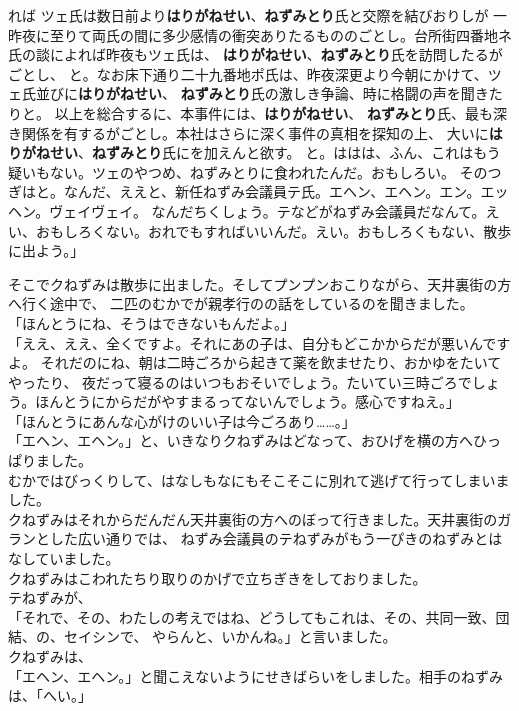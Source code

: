 \documentclass[
a4paper,
10pt,
book]
{tarticle}
\begin{document}
\newpage
\thispagestyle{fancy}
\fancyhead[R]{\empty}
れば
ツェ氏は数日前より\textbf{はりがねせい}、\textbf{ねずみとり}氏と交際を結びおりしが
一昨夜に至りて両氏の間に多少感情の衝突ありたるもののごとし。台所街四番地ネ氏の談によれば昨夜もツェ氏は、
\textbf{はりがねせい}、\textbf{ねずみとり}氏を訪問したるがごとし、
と。なお床下通り二十九番地ポ氏は、昨夜深更より今朝にかけて、ツェ氏並びに\textbf{はりがねせい}、
\textbf{ねずみとり}氏の激しき争論、時に格闘の声を聞きたりと。
以上を総合するに、本事件には、\textbf{はりがねせい}、
\textbf{ねずみとり}氏、最も深き関係を有するがごとし。本社はさらに深く事件の真相を探知の上、
大いに\textbf{はりがねせい}、\textbf{ねずみとり}氏にを加えんと欲す。
と。ははは、ふん、これはもう疑いもない。ツェのやつめ、ねずみとりに食われたんだ。おもしろい。
そのつぎはと。なんだ、ええと、新任ねずみ会議員テ氏。エヘン、エヘン。エン。エッヘン。ヴェイヴェイ。
なんだちくしょう。テなどがねずみ会議員だなんて。えい、おもしろくない。おれでもすればいいんだ。えい。おもしろくもない、散歩に出よう。」

\newpage
\thispagestyle{fancy}
\fancyhead[C]{\empty}
\indent そこでクねずみは散歩に出ました。そしてプンプンおこりながら、天井裏街の方へ行く途中で、
二匹のむかでが親孝行のの話をしているのを聞きました。\indent \\
「ほんとうにね、そうはできないもんだよ。」\\
「ええ、ええ、全くですよ。それにあの子は、自分もどこかからだが悪いんですよ。
それだのにね、朝は二時ごろから起きて薬を飲ませたり、おかゆをたいてやったり、
夜だって寝るのはいつもおそいでしょう。たいてい三時ごろでしょう。ほんとうにからだがやすまるってないんでしょう。感心ですねえ。」\\
「ほんとうにあんな心がけのいい子は今ごろあり……。」\\
「エヘン、エヘン。」と、いきなりクねずみはどなって、おひげを横の方へひっぱりました。\\
\indent むかではびっくりして、はなしもなにもそこそこに別れて逃げて行ってしまいました。\\
\indent クねずみはそれからだんだん天井裏街の方へのぼって行きました。天井裏街のガランとした広い通りでは、
ねずみ会議員のテねずみがもう一ぴきのねずみとはなしていました。\\
\indent クねずみはこわれたちり取りのかげで立ちぎきをしておりました。\\
\indent テねずみが、\\
「それで、その、わたしの考えではね、どうしてもこれは、その、共同一致、団結、の、セイシンで、
やらんと、いかんね。」と言いました。\\
\indent クねずみは、\\
「エヘン、エヘン。」と聞こえないようにせきばらいをしました。相手のねずみは、「へい。」
\end{document}

